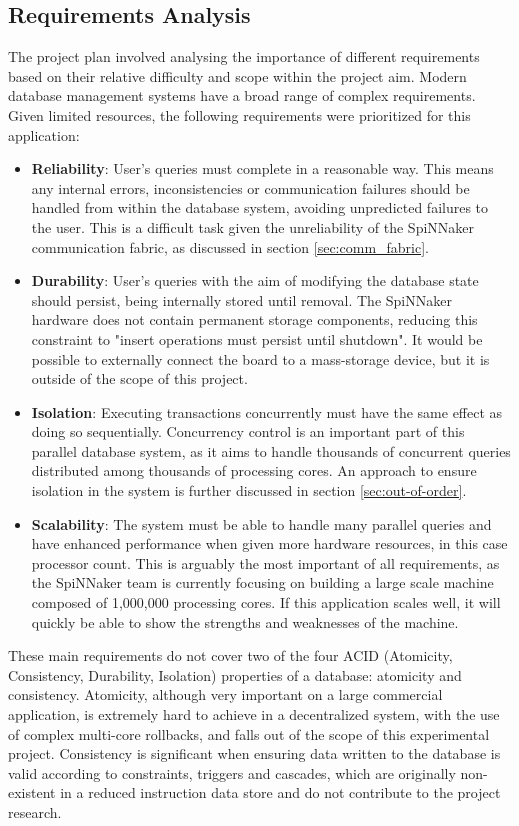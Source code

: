 \subsection{Requirements Analysis}
The project plan involved analysing the importance of different requirements based on their relative difficulty and scope within the project aim. Modern database management systems have a broad range of complex requirements. Given limited resources, the following requirements were prioritized for this application:

\begin{itemize}
	\item \textbf{Reliability}: User's queries must complete in a reasonable way. This means any internal errors, inconsistencies or communication failures should be handled from within the database system, avoiding unpredicted failures to the user. This is a difficult task given the unreliability of the SpiNNaker communication fabric, as discussed in section \ref{sec:comm_fabric}.
	\item \textbf{Durability}: User's queries with the aim of modifying the database state should persist, being internally stored until removal. The SpiNNaker hardware does not contain permanent storage components, reducing this constraint to "insert operations must persist until shutdown". It would be possible to externally connect the board to a mass-storage device, but it is outside of the scope of this project.
	\item \textbf{Isolation}: Executing transactions concurrently must have the same effect as doing so sequentially. Concurrency control is an important part of this parallel database system, as it aims to handle thousands of concurrent queries distributed among thousands of processing cores. An approach to ensure isolation in the system is further discussed in section \ref{sec:out-of-order}.
	\item \textbf{Scalability}: The system must be able to handle many parallel queries and have enhanced performance when given more hardware resources, in this case processor count.	This is arguably the most important of all requirements, as the SpiNNaker team is currently focusing on building a large scale machine composed of 1,000,000 processing cores. If this application scales well, it will quickly be able to show the strengths and weaknesses of the machine.
\end{itemize}

These main requirements do not cover two of the four ACID (Atomicity, Consistency, Durability, Isolation) properties of a database: atomicity and consistency. Atomicity, although very important on a large commercial application, is extremely hard to achieve in a decentralized system, with the use of complex multi-core rollbacks, and falls out of the scope of this experimental project. Consistency is significant when ensuring data written to the database is valid according to constraints, triggers and cascades, which are originally non-existent in a reduced instruction data store and do not contribute to the project research.

